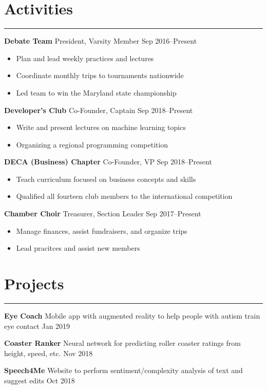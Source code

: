\documentclass[11pt]{article}
\newcommand{\resumesection}[1]{\vspace{-0.3cm}\section*{\color{highlight}#1}\vspace{-0.3cm}\hrule\vspace{0.3cm}}
\begin{document}
\resumesection{Activities}

\textbf{Debate Team} President, Varsity Member \hfill Sep 2016--Present \par
\begin{itemize}
	\item Plan and lead weekly practices and lectures
	\item Coordinate monthly trips to tournaments nationwide
	\item Led team to win the Maryland state championship
\end{itemize}\vspace{0.1cm}

\textbf{Developer's Club} Co-Founder, Captain \hfill Sep 2018--Present \par
\begin{itemize}
	\item Write and present lectures on machine learning topics
	\item Organizing a regional programming competition
\end{itemize}\vspace{0.1cm}

\textbf{DECA (Business) Chapter} Co-Founder, VP \hfill Sep 2018--Present \par
\begin{itemize}
	\item Teach curriculum focused on business concepts and skills
	\item Qualified all fourteen club members to the international competition
\end{itemize}\vspace{0.1cm}

\textbf{Chamber Choir} Treasurer, Section Leader \hfill Sep 2017--Present \par
\begin{itemize}
	\item Manage finances, assist fundraisers, and organize trips
	\item Lead pracitces and assist new members
\end{itemize}

\resumesection{Projects}


\textbf{Eye Coach} Mobile app with augmented reality to help people with autism train eye contact \hfill Jan 2019 \par
\vspace{0.1cm}

\textbf{Coaster Ranker} Neural network for predicting roller coaster ratings from height, speed, etc.  \hfill Nov 2018 \par\vspace{0.1cm}

\textbf{Speech4Me} Website to perform sentiment/complexity analysis of text and suggest edits \hfill Oct 2018 \par
\vspace{0.1cm}
\end{document}
